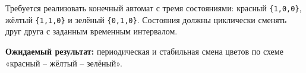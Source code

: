 \begin{taskbox}
\indent Требуется реализовать конечный автомат с тремя состояниями: красный \verb|{1,0,0}|, жёлтый \verb|{1,1,0}| и зелёный \verb|{0,1,0}|. Состояния должны циклически сменять друг друга с заданным временным интервалом.

\noindent\textbf{Ожидаемый результат:} периодическая и стабильная смена цветов по схеме «красный -- жёлтый -- зелёный».
\end{taskbox}
